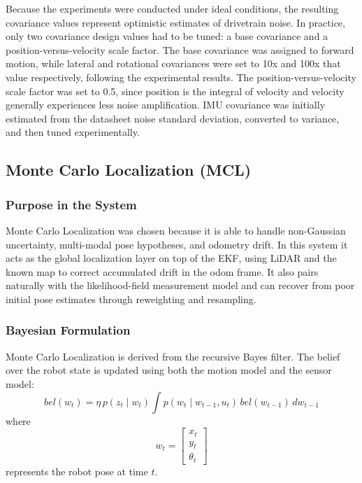 \documentclass[11pt]{article}
\begin{document}
\noindent Because the experiments were conducted under ideal conditions, the resulting covariance values represent
          optimistic estimates of drivetrain noise. In practice, only two covariance design values had to be tuned: a
          base covariance and a position-versus-velocity scale factor. The base covariance was assigned to forward
          motion, while lateral and rotational covariances were set to 10x and 100x that value respectively, following
          the experimental results. The position-versus-velocity scale factor was set to 0.5, since position is the
          integral of velocity and velocity generally experiences less noise amplification. IMU covariance was initially
          estimated from the datasheet noise standard deviation, converted to variance, and then tuned experimentally.

\subsection{Monte Carlo Localization (MCL)}
\subsubsection{Purpose in the System}
Monte Carlo Localization was chosen because it is able to handle non-Gaussian uncertainty, multi-modal pose hypotheses, and
odometry drift.
In this system it acts as the global localization layer on top of the EKF, using LiDAR and the known map
to correct accumulated drift in the odom frame. It also pairs naturally with the likelihood-field measurement model and can
recover from poor initial pose estimates through reweighting and resampling.

\subsubsection{Bayesian Formulation}
Monte Carlo Localization is derived from the recursive Bayes filter. The belief over the robot state is updated using
both the motion model and the sensor model:
\begin{equation}
bel(w_t) =
\eta \, p(z_t \mid w_t)
\int p(w_t \mid w_{t-1}, u_t)\, bel(w_{t-1}) \, dw_{t-1}
\end{equation}
\noindent where
\[
w_t =
\begin{bmatrix}
x_t \\
y_t \\
\theta_t
\end{bmatrix}
\]
\noindent represents the robot pose at time $t$.
\end{document}
